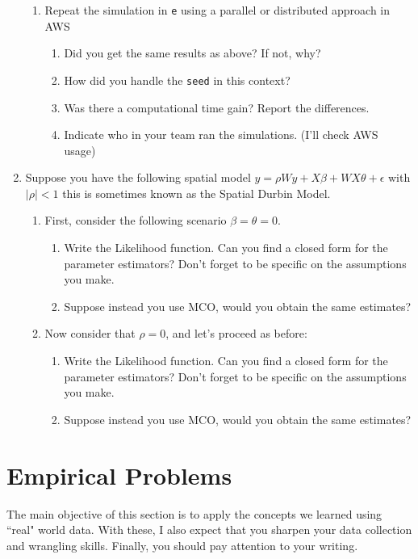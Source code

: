 \documentclass[12pt,onecolumn]{article}
\begin{document}
\begin{enumerate}
\begin{enumerate}
  \item Repeat the simulation in \texttt{e} using a parallel or distributed approach in AWS
  \begin{enumerate}
    \item Did you get the same results as above? If not, why?
    \item How did you handle the \texttt{seed} in this context?
    \item Was there a computational time gain? Report the differences.
    \item Indicate who in your team ran the simulations. (I'll check AWS usage)
  \end{enumerate}

    \end{enumerate}
  

  \item Suppose you have the following spatial model $y=\rho W y + X\beta + WX\theta  +\epsilon$ with $|\rho|<1$  this is sometimes known as the Spatial Durbin Model.
  \begin{enumerate}
    \item First, consider the following scenario  $\beta=\theta=0$. 
    \begin{enumerate}
      \item Write the Likelihood function. Can you find a closed form for the parameter estimators? Don't forget to be specific on the assumptions you make.
      \item Suppose instead you use MCO, would you obtain the same estimates? 
    \end{enumerate}  
    \item Now consider that $\rho=0$, and let's proceed as before:
    \begin{enumerate}
      \item Write the Likelihood function. Can you find a closed form for the parameter estimators? Don't forget to be specific on the assumptions you make.
      \item Suppose instead you use MCO, would you obtain the same estimates? 
  \end{enumerate}  
  \end{enumerate}  
  \end{enumerate}  

\section{Empirical Problems}


The main objective of this section is to apply the concepts we learned using ``real" world data. With these, I also expect that you sharpen your data collection and wrangling skills. Finally, you should pay attention to your writing.
\end{document}
